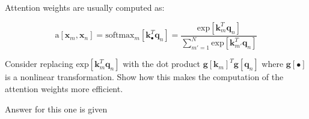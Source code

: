 \documentclass[12pt]{report}
\begin{document}
\subsection{}
\begin{mdframed}
    Attention weights are usually computed as:

    \begin{equation*}
        \text{a}[\mathbf{x}_{m}, \mathbf{x}_{n}] = \text{softmax}_{m}\left[\mathbf{k}^{T}_{\bullet}\mathbf{q}_{n}\right] = \frac{\text{exp}[\mathbf{k}^{T}_{m}\mathbf{q}_{n}]}{\sum_{m'=1}^{N} \text{exp}[\mathbf{k}^{T}_{m'}\mathbf{q}_{n}]}
    \end{equation*}

    Consider replacing $\text{exp}[\mathbf{k}^{T}_{m}\mathbf{q}_{n}]$ with the dot product $\mathbf{g}[\mathbf{k}_{m}]^{T}\mathbf{g}[\mathbf{q}_{n}]$ where $\mathbf{g}[\bullet]$ is a nonlinear  transformation. Show how this makes the computation of the attention weights more eﬀicient.
\end{mdframed}

Answer for this one is given
\end{document}
